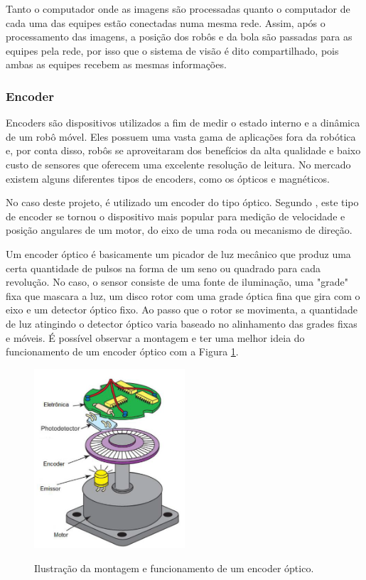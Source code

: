 \documentclass[acronym, symbols]{fei}
\begin{document}
				Tanto o computador onde as imagens são processadas quanto o computador de cada uma das equipes estão conectadas numa mesma rede. Assim, após o processamento das imagens, a posição dos robôs e da bola são passadas para as equipes pela rede, por isso que o sistema de visão é dito compartilhado, pois ambas as equipes recebem as mesmas informações.
			
			\subsubsection{Encoder}
				
				Encoders são dispositivos utilizados a fim de medir o estado interno e a dinâmica de um robô móvel. Eles possuem uma vasta gama de aplicações fora da robótica e, por conta disso, robôs se aproveitaram dos benefícios da alta qualidade e baixo custo de sensores que oferecem uma excelente resolução de leitura. No mercado existem alguns diferentes tipos de encoders, como os ópticos e magnéticos. 
				
				No caso deste projeto, é utilizado um encoder do tipo óptico. Segundo \textcite{siegwart2011introduction}, este tipo de encoder se tornou o dispositivo mais popular para medição de velocidade e posição angulares de um motor, do eixo de uma roda ou mecanismo de direção.
				
				Um encoder óptico é basicamente um picador de luz mecânico que produz uma certa quantidade de pulsos na forma de um seno ou quadrado para cada revolução. No caso, o sensor consiste de uma fonte de iluminação, uma "grade" fixa que mascara a luz, um disco rotor com uma grade óptica fina que gira com o eixo e um detector óptico fixo. Ao passo que o rotor se movimenta, a quantidade de luz atingindo o detector óptico varia baseado no alinhamento das grades fixas e móveis. É possível observar a montagem e ter uma melhor ideia do funcionamento de um encoder óptico com a Figura \ref{fig:optical_encoder}.
				
				\begin{figure}[!htb]
					\centering
					\caption{Ilustração da montagem e funcionamento de um encoder óptico.} 
					\includegraphics[width=0.5\textwidth]{encoder_optico.png}
					\label{fig:optical_encoder}
				\end{figure}
			
\end{document}
